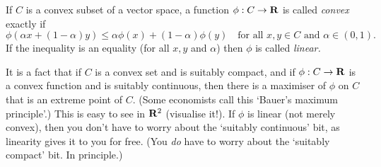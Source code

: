 \documentclass[11pt,letterpaper,reqno,oneside]{book}
\begin{document}
\begin{appendices}
If $C$ is a convex subset of a vector space,
a function $\phi : C \to \mathbf{R}$ is called \emph{convex} exactly if
%
\begin{equation*}
	\phi( \alpha x + (1-\alpha) y )
	\leq \alpha \phi(x) + (1-\alpha) \phi(y)
	\quad \text{for all $x,y \in C$ and $\alpha \in (0,1)$.}
\end{equation*}
%
If the inequality is an equality (for all $x,y$ and $\alpha$)
then $\phi$ is called \emph{linear.}

It is a fact that if $C$ is a convex set and is suitably compact,
and if $\phi : C \to \mathbf{R}$ is a convex function and is suitably continuous,
then there is a maximiser of $\phi$ on $C$ that is an extreme point of $C$.
(Some economists call this `Bauer's maximum principle'.)
This is easy to see in $\mathbf{R}^2$ (visualise it!).
If $\phi$ is linear (not merely convex), then you don't have to worry about the `suitably continuous' bit, as linearity gives it to you for free.
(You \emph{do} have to worry about the `suitably compact' bit. In principle.)



\end{appendices}








\printbibliography[heading=bibintoc]



\end{document}
